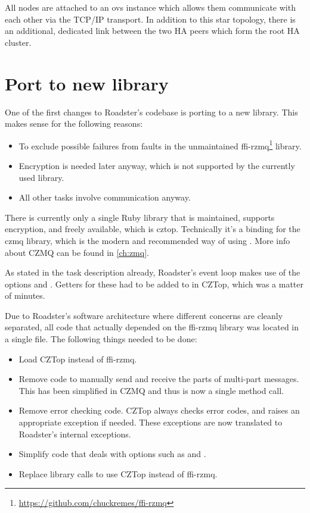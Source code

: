 All nodes are attached to an \gls{ovs} instance which allows them communicate with each
other via the TCP/IP transport. In addition to this star topology, there is an
additional, dedicated link between the two HA peers which form the root HA
cluster.


\section{Port to new \zmq library}\label{sec:approach:port}
One of the first changes to Roadster's codebase is porting to a new \zmq
library. This makes sense for the following reasons:

\begin{itemize}
\item To exclude possible failures from faults in the unmaintained ffi-rzmq\footnote{\url{https://github.com/chuckremes/ffi-rzmq}} library.
\item Encryption is needed later anyway, which is not supported by the currently used library.
\item All other tasks involve \zmq communication anyway.
\end{itemize}

There is currently only a single Ruby library that is maintained, supports
encryption, and freely available, which is \gls{cztop}. Technically it's a
binding for the \gls{czmq} library, which is the modern and recommended way of
using \zmq. More info about CZMQ can be found in \autoref{ch:zmq}.

As stated in the task description already, Roadster's event loop makes use of
the \zmq options  and . Getters for these had to be
added to in CZTop, which was a matter of minutes.

Due to Roadster's software architecture where different concerns are cleanly separated, all code that actually depended
on the ffi-rzmq library was located in a single file. The following
things needed to be done:

\begin{itemize}
\item Load CZTop instead of ffi-rzmq.
\item Remove code to manually send and receive the parts of multi-part messages. This has been simplified
in CZMQ and thus is now a single method call.
\item Remove error checking code. CZTop always checks error codes, and raises
an appropriate exception if needed. These exceptions are now translated to Roadster's internal exceptions.
\item Simplify code that deals with \zmq options such as  and .
\item Replace library calls to use CZTop instead of ffi-rzmq.
\end{itemize}

